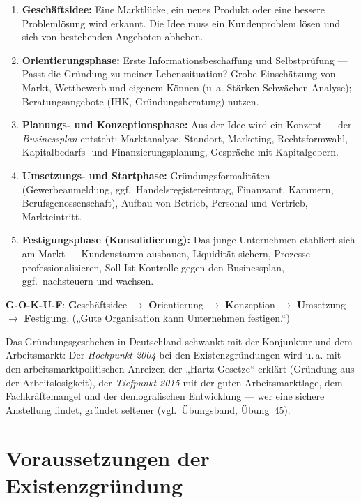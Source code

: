 \documentclass[11pt, a4paper]{article}
\begin{document}
\begin{enumerate}
  \item \textbf{Geschäftsidee:} Eine Marktlücke, ein neues Produkt oder eine bessere
    Problemlösung wird erkannt. Die Idee muss ein Kundenproblem lösen und sich von
    bestehenden Angeboten abheben.
  \item \textbf{Orientierungsphase:} Erste Informationsbeschaffung und Selbstprüfung ---
    Passt die Gründung zu meiner Lebenssituation? Grobe Einschätzung von Markt, Wettbewerb
    und eigenem Können (u.\,a. Stärken-Schwächen-Analyse); Beratungsangebote (IHK,
    Gründungsberatung) nutzen.
  \item \textbf{Planungs- und Konzeptionsphase:} Aus der Idee wird ein Konzept --- der
    \emph{Businessplan} entsteht: Marktanalyse, Standort, Marketing, Rechtsformwahl,
    Kapitalbedarfs- und Finanzierungsplanung, Gespräche mit Kapitalgebern.
  \item \textbf{Umsetzungs- und Startphase:} Gründungsformalitäten (Gewerbeanmeldung,
    ggf.\ Handelsregistereintrag, Finanzamt, Kammern, Berufsgenossenschaft), Aufbau von
    Betrieb, Personal und Vertrieb, Markteintritt.
  \item \textbf{Festigungsphase (Konsolidierung):} Das junge Unternehmen etabliert sich am
    Markt --- Kundenstamm ausbauen, Liquidität sichern, Prozesse professionalisieren,
    Soll-Ist-Kontrolle gegen den Businessplan, ggf.\ nachsteuern und wachsen.
\end{enumerate}

\begin{eselsbruecke}
\textbf{G-O-K-U-F}: \textbf{G}eschäftsidee $\rightarrow$ \textbf{O}rientierung
$\rightarrow$ \textbf{K}onzeption $\rightarrow$ \textbf{U}msetzung $\rightarrow$
\textbf{F}estigung. („Gute Organisation kann Unternehmen festigen.``)
\end{eselsbruecke}

\begin{beispiel}
Das Gründungsgeschehen in Deutschland schwankt mit der Konjunktur und dem Arbeitsmarkt:
Der \emph{Hochpunkt 2004} bei den Existenzgründungen wird u.\,a. mit den
arbeitsmarktpolitischen Anreizen der „Hartz-Gesetze`` erklärt (Gründung aus der
Arbeitslosigkeit), der \emph{Tiefpunkt 2015} mit der guten Arbeitsmarktlage, dem
Fachkräftemangel und der demografischen Entwicklung --- wer eine sichere Anstellung
findet, gründet seltener (vgl.\ Übungsband, Übung~45).
\end{beispiel}

\section{Voraussetzungen der Existenzgründung}
\end{document}
